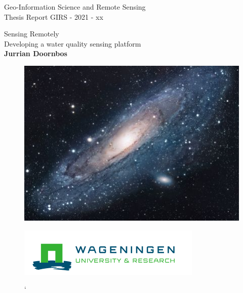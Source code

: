 \graphicspath{{./images/}}



\newcommand{\centerimg}[2][width=\textwidth]{%
  \makebox[\textwidth]{\texttt{[image: \#2]}}%
}

\begin{titlepage}

    \begin{flushleft}
    \Large
    Geo-Information Science and Remote Sensing\\
    Thesis Report GIRS - 2021 - xx\\
    \noindent\makebox[\linewidth]{\rule{\paperwidth}{0.4pt}}
    
    \vspace{1cm}
    
    \LARGE
        Sensing Remotely\\
    \Large
    \vspace{0.2cm}
        Developing a water quality sensing platform\\
    \large
    \vspace{1cm}
    \textbf{Jurrian Doornbos}
    
    \end{flushleft}
    \vfill
     \begin{figure}[h]
    \includegraphics{universe}
    \end{figure}
    
    \vfill
    
    \begin{figure}[h]
    \includegraphics{WUR.png}
    \end{figure}
    \begin{figure}[b]
   \centerimg[width=\paperwidth]{sherpa.png}
`   \end{figure}
    
\end{titlepage}